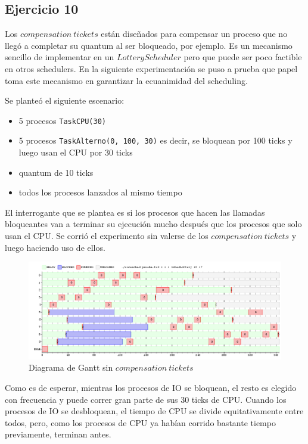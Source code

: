 \documentclass[11pt, a4paper, twoside]{article}
\begin{document}
\clearpage
\subsection{Ejercicio 10}

Los $compensation\ tickets$ están diseñados para compensar un proceso que no llegó a completar su quantum al ser bloqueado, por ejemplo. Es un mecanismo sencillo de implementar en un $Lottery Scheduler$ pero que puede ser poco factible en otros schedulers. En la siguiente experimentación se puso a prueba que papel toma este mecanismo en garantizar la ecuanimidad del scheduling.

Se planteó el siguiente escenario:
\begin{itemize}
    \item 5 procesos \texttt{TaskCPU(30)}
    \item 5 procesos \texttt{TaskAlterno(0, 100, 30)} es decir, se bloquean por 100 ticks y luego usan el CPU por 30 ticks
    \item quantum de 10 ticks
    \item todos los procesos lanzados al mismo tiempo
\end{itemize}

El interrogante que se plantea es si los procesos que hacen las llamadas bloqueantes van a terminar su ejecución mucho después que los procesos que solo usan el CPU. Se corrió el experimento sin valerse de los $compensation\ tickets$ y luego haciendo uso de ellos.

\begin{figure}[H]
\centering
\includegraphics[width=\textwidth]{../experimentacion/ej10-compensation/gant-sin.png}
\caption{Diagrama de Gantt sin $compensation\ tickets$}
\end{figure}

Como es de esperar, mientras los procesos de IO se bloquean, el resto es elegido con frecuencia y puede correr gran parte de sus 30 ticks de CPU. Cuando los procesos de IO se desbloquean, el tiempo de CPU se divide equitativamente entre todos, pero, como los procesos de CPU ya habían corrido bastante tiempo previamente, terminan antes.
\end{document}
